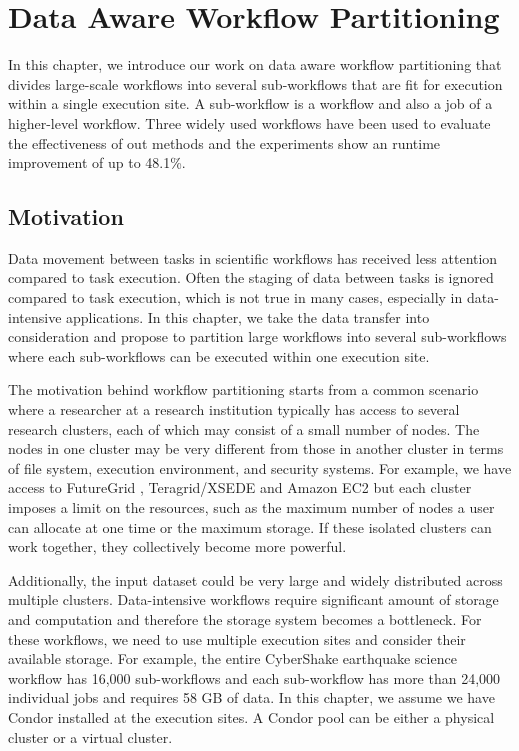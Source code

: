 \chapter{Data Aware Workflow Partitioning}
\label{chap:partitioning}

In this chapter, we introduce our work on data aware workflow partitioning that divides large-scale workflows into several sub-workflows that are fit for execution within a single execution site. A sub-workflow is a workflow and also a job of a higher-level workflow. Three widely used workflows have been used to evaluate the effectiveness of out methods and the experiments show an runtime improvement of up to 48.1\%. 


\section{Motivation}

Data movement between tasks in scientific workflows has received less attention compared to task execution. Often the staging of data between tasks is ignored compared to task execution, which is not true in many cases, especially in data-intensive applications. In this chapter, we take the data transfer into consideration and propose to partition large workflows into several sub-workflows where each sub-workflows can be executed within one execution site. 

The motivation behind workflow partitioning starts from a common scenario where a researcher at a research institution typically has access to several research clusters, each of which may consist of a small number of nodes. The nodes in one cluster may be very different from those in another cluster in terms of file system, execution environment, and security systems. For example, we have access to FutureGrid \cite{Fox2013FutureGrid}, Teragrid/XSEDE \cite{TeraGrid}  and Amazon EC2 \cite{AmazonAWS} but each cluster imposes a limit on the resources, such as the maximum number of nodes a user can allocate at one time or the maximum storage. If these isolated clusters can work together, they collectively become more powerful.

Additionally, the input dataset could be very large and widely distributed across multiple clusters. Data-intensive workflows require significant amount of storage and computation and therefore the storage system becomes a bottleneck. For these workflows, we need to use multiple execution sites and consider their available storage. For example, the entire CyberShake earthquake science workflow has 16,000 sub-workflows and each sub-workflow has more than 24,000 individual jobs and requires 58 GB of data. In this chapter, we assume we have Condor installed at the execution sites. A Condor pool \cite{Kalayci2010} can be either a physical cluster or a virtual cluster. 

